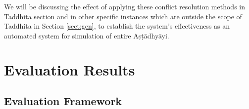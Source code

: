 \documentclass[a4paper,11pt,twoside,openright]{report}
\begin{document}
We will be discussing the effect of applying these conflict resolution methods in Taddhita section and in other specific instances which are outside the scope of Taddhita in Section \ref{sect:gen}, to establish the system's effectiveness as an automated system for simulation of entire Aṣṭādhyāyi.  






\chapter{Evaluation Results}
\label{chapter 5}


\section{Evaluation Framework}
\end{document}
